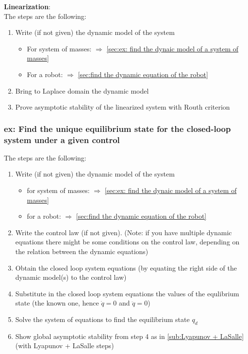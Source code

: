 \documentclass[a4paper,12pt]{article}
\begin{document}
\textbf{Linearization}:\\
The steps are the following:
\begin{enumerate}
    \item Write (if not given) the dynamic model of the system 
    \begin{itemize}
        \item For system of masses: $\Rightarrow$ \ref{sec:ex: find the dynaic model of a system of masses}
        \item For a robot: $\Rightarrow$ \ref{sec:find the dynamic equation of the robot}
    \end{itemize}
    \item Bring to Laplace domain the dynamic model
    \item Prove asymptotic stability of the linearized system
    with Routh criterion 
\end{enumerate}
\subsubsection{ex: Find the unique equilibrium state for the closed-loop system under a given control}
The steps are the following:
\begin{enumerate}
    \item Write (if not given) the dynamic model of the system 
    \begin{itemize}
        \item for system of masses: $\Rightarrow$ \ref{sec:ex: find the dynaic model of a system of masses}
        \item for a robot: $\Rightarrow$ \ref{sec:find the dynamic equation of the robot}
    \end{itemize}
    \item Write the control law (if not given). (Note: if you have multiple
    dynamic equations there might be some conditions on the control law, depending
    on the relation between the dynamic equations)
    \item Obtain the closed loop system equations (by 
    equating the right side of the dynamic model(s) to the control law)
    \item Substitute in the closed loop system equations the
    values of the equlibrium state (the known one, hence $\dot{q}=0$ and 
    $\ddot{q}=0$)
    \item Solve the system of equations to find the equilibrium state $q_d$
    \item Show global asymptotic stability from step 4 as in \ref{sub:Lyapunov + LaSalle} (with Lyapunov + LaSalle steps)
\end{enumerate}
\end{document}
